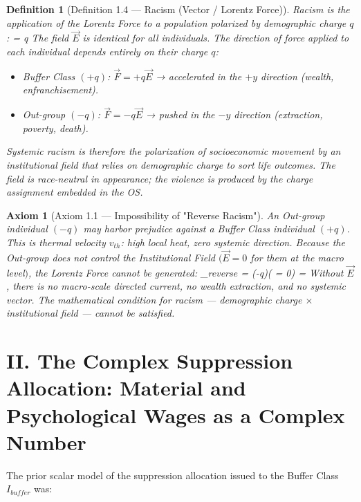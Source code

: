 \documentclass[12pt]{book}
\numberwithin{equation}{chapter}
\newtheorem{definition}{Definition}[chapter]
\newtheorem{axiom}{Axiom}[chapter]
\begin{document}
\begin{definition}[Definition 1.4 — Racism (Vector / Lorentz Force)]
Racism is the application of the Lorentz Force to a population polarized by demographic charge $q$:
       = q
    The field $\vec{E}$ is identical for all individuals. The \emph{direction of force applied to each individual} depends entirely on their charge $q$:
    
\begin{itemize}

\item Buffer Class $(+q)$: $\vec{F} = +q\vec{E}$ → accelerated in the $+y$ direction (wealth, enfranchisement).

\item Out-group $(-q)$: $\vec{F} = -q\vec{E}$ → pushed in the $-y$ direction (extraction, poverty, death).

\end{itemize}

    Systemic racism is therefore the polarization of socioeconomic movement by an institutional field that relies on demographic charge to sort life outcomes. The field is race-neutral in appearance; the violence is produced by the charge assignment embedded in the OS.
  \end{definition}

\begin{axiom}[Axiom 1.1 — Impossibility of "Reverse Racism"]
An Out-group individual $(-q)$ may harbor prejudice against a Buffer Class individual $(+q)$. This is thermal velocity $v_{th}$: high local heat, zero systemic direction. Because the Out-group does not control the Institutional Field $(\vec{E} = 0$ for them at the macro level$)$, the Lorentz Force cannot be generated:
      _{reverse} = (-q)( = 0) = 
    Without $\vec{E}$, there is no macro-scale directed current, no wealth extraction, and no systemic vector. The mathematical condition for racism — demographic charge $\times$ institutional field — cannot be satisfied.
  \end{axiom}

\section{II. The Complex Suppression Allocation: Material and Psychological Wages as a Complex Number}

    The prior scalar model of the suppression allocation issued to the Buffer Class $I_{buffer}$ was:
  
\end{document}
